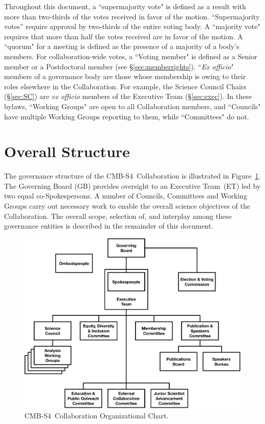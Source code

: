 \documentclass[12pt]{article}
\newcommand{\exec}{{Executive Team}}
\newcommand\collabname{CMB-S4}
\begin{document}
Throughout this document,  a ``supermajority vote" is defined as a result with more than two-thirds of the votes received in favor of  the motion. ``Supermajority votes'' require approval by two-thirds of the entire voting body. A ``majority vote" requires that more than half the votes received are in favor of the motion.   A ``quorum" for a meeting is defined as the presence of a majority of a body's members.   For collaboration-wide votes, a ``Voting member" is  defined as a Senior member or a Postdoctoral member (see \S\ref{sec:memberrights}). ``{\it Ex officio}" members of a governance body are those whose membership is owing to their roles elsewhere in the Collaboration.  For example, the Science Council Chairs (\S\ref{sec:SC}) are {\it ex officio} members of the Executive Team (\S\ref{sec:exec}).  In these bylaws,  ``Working Groups" are open to all Collaboration members, and ``Councils" have multiple Working Groups reporting to them, while ``Committees" do not.

\section{Overall Structure}

The governance structure of the \collabname\ Collaboration is illustrated in Figure~\ref{fig:org_chart}.  The Governing Board (GB) provides oversight to an \exec\ (ET) led by two equal co-Spokespersons.  A number of Councils, Committees and Working Groups carry out necessary work to enable the overall science objectives of the Collaboration. The overall scope, selection of, and interplay among these governance entities is described in the remainder of this document.

\begin{figure}[h!]
\begin{center}
\includegraphics[width=6.5in]{cmbs4_org_v11.pdf}
\end{center}
\caption{\collabname\ Collaboration Organizational Chart. }
\label{fig:org_chart}
\end{figure}
\end{document}
